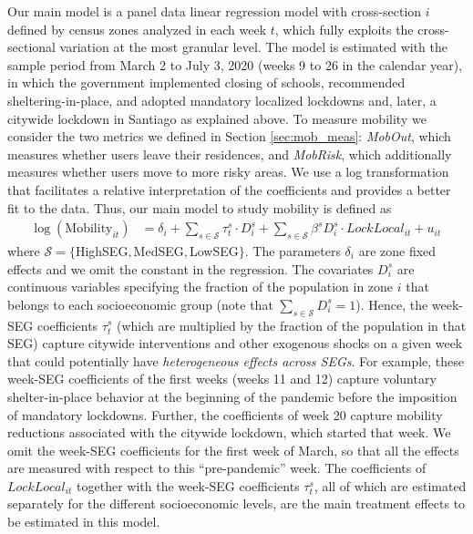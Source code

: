 Our main model is a panel data linear regression model with cross-section $i$ defined by census zones analyzed in each week $t$, which fully exploits the cross-sectional variation at the most granular level. The model is estimated with the sample period from March 2 to July 3, 2020 (weeks 9 to 26 in the calendar year), in which the government implemented closing of schools, recommended sheltering-in-place, and adopted mandatory localized lockdowns and, later, a citywide lockdown in Santiago as explained above. To measure mobility we consider the two metrics we defined in Section \ref{sec:mob_meas}: \emph{MobOut}, which measures whether users leave their residences, and \emph{MobRisk}, which additionally measures whether users move to more risky areas. We use a log transformation that facilitates a relative interpretation of the coefficients and provides a better fit to the data. Thus, our main model to study mobility is defined as
\begin{align}
\log{(\text{Mobility}_{it})} &=\delta_{i}+\sum_{s\in\mathcal{S}} \tau^s_{t} \cdot D^s_{i} +  \sum_{s\in\mathcal{S}} \beta^s D^s_{i}\cdot LockLocal_{it} + u_{it} \label{eq:FracOut_wkhet} \,
\end{align}
where $\mathcal{S}=\{$HighSEG$, $MedSEG$, $LowSEG$\}$. The parameters $\delta_{i}$ are zone fixed effects and we omit the constant in the regression. The covariates $D_i^s$ are continuous variables specifying the fraction of the population in zone $i$ that belongs to each socioeconomic group (note that $\sum_{s\in\mathcal{S}} D_i^s=1$). Hence, the week-SEG coefficients $\tau_t^s$ (which are multiplied by the fraction of the population in that SEG) capture citywide interventions and other exogenous shocks on a given week that could potentially have {\em heterogeneous effects across SEGs}. For example, these week-SEG coefficients of the first weeks (weeks 11 and 12) capture voluntary shelter-in-place behavior at the beginning of the pandemic before the imposition of mandatory lockdowns.  Further, the coefficients of week 20 capture mobility reductions associated with the citywide lockdown, which started that week. We omit the week-SEG coefficients for the first week of March, so that all the effects are measured with respect to this ``pre-pandemic'' week. The coefficients of $LockLocal_{it}$ together with the week-SEG coefficients $\tau_t^s$, all of which are estimated separately for the different socioeconomic levels, are the main treatment effects to be estimated in this model. 
 
